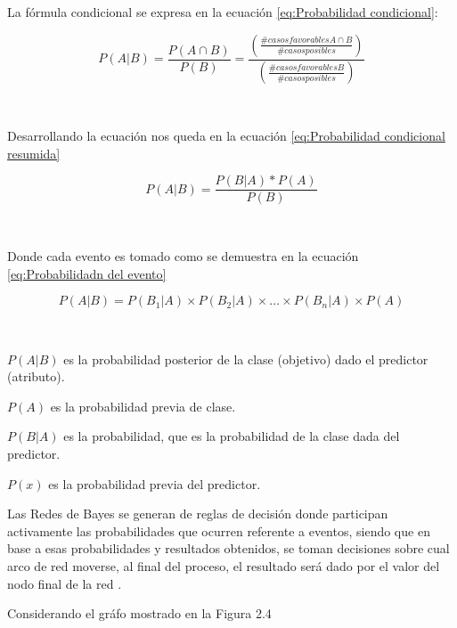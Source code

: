 \par La fórmula condicional se expresa en la ecuación \ref{eq:Probabilidad condicional}:\\
\begin{Large}
	\begin{equation}
		P(A|B)=\frac{P(A \cap B)}{P(B)}= \frac{(\frac{\#casos favorables A \cap B}{\#casos posibles})}{(\frac{\#casos favorables B}{\#casos posibles})}
		\label{eq:Probabilidad condicional}
	\end{equation}
\end{Large}\\
\par Desarrollando la ecuación nos queda en la ecuación \ref{eq:Probabilidad condicional resumida}\\
\begin{Large}
	\begin{equation}
		P(A|B)=\frac{P(B|A)*P(A)}{P(B)}
		\label{eq:Probabilidad condicional resumida}
	\end{equation}
\end{Large}\\
\par Donde cada evento es tomado como se demuestra en la ecuación \ref{eq:Probabilidadn del evento}\\
\begin{large}
	\begin{equation}
		P(A|B)= P(B_{1}|A) \times P(B_{2}|A) \times … \times P(B_{n}|A) \times P(A)
		\label{eq:Probabilidadn del evento}
	\end{equation}
\end{large}\\
\par $P(A|B)$ es la probabilidad posterior de la clase (objetivo) dado el predictor (atributo).
\par $P(A)$ es la probabilidad previa de clase.
\par $P(B|A)$ es la probabilidad, que es la probabilidad de la clase dada del predictor.
\par  $P(x)$ es la probabilidad previa del predictor.\\

\par Las Redes de Bayes se generan de reglas de decisión donde participan activamente las probabilidades que ocurren referente a eventos, siendo que en base a esas probabilidades y resultados obtenidos, se toman decisiones sobre cual arco de red moverse, al final del proceso, el resultado será dado por el valor del nodo final de la red \cite{Bell15}.\\
\par Considerando el gráfo mostrado en la Figura 2.4

